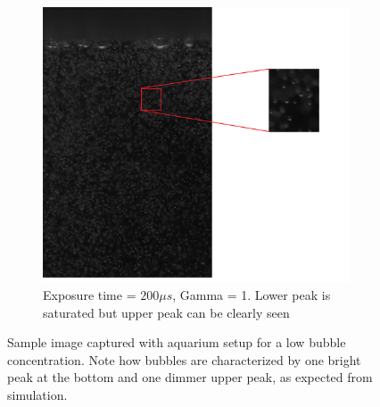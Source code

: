 \begin{figure}
			\begin{subfigure}[b]{.55\textwidth}
				\centering
				\includegraphics[scale=0.3]{images/aquarium_result_surf.png}
				\caption{Exposure time = $200 \mu s$, Gamma = 1. Lower peak is saturated but upper peak can be clearly seen}
				\label{subfig:aquarium_result_sat}
			\end{subfigure}
			\caption{Sample image captured with aquarium setup for a low bubble concentration. Note how bubbles are characterized by one bright peak at the bottom and one dimmer upper peak, as expected from simulation.}			
			\label{fig:aqauarium_result}
		\end{figure}
					
